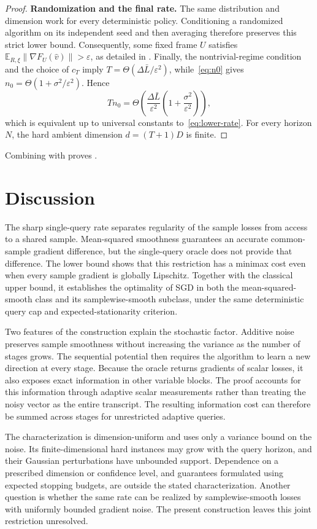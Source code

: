 \documentclass[11pt]{article}
\newcommand{\E}{\mathbb E}
\newcommand{\eps}{\varepsilon}
\newcommand{\Lb}{\bar L}
\theoremstyle{definition}
\theoremstyle{remark}
\begin{document}
\begin{proof}
\noindent\textbf{Randomization and the final rate.}
The same distribution and dimension work for every deterministic policy.
Conditioning a randomized algorithm on its independent seed and then averaging
therefore preserves this strict lower bound.  Consequently, some fixed frame
$U$ satisfies $\E_{R,\xi}\|\nabla F_U(\widehat v)\|>\eps$, as detailed in
.  Finally, the nontrivial-regime condition and the choice of
$c_T$ imply
$T=\Theta(\Delta\Lb/\eps^2)$, while~\eqref{eq:n0} gives
$n_0=\Theta(1+\sigma^2/\eps^2)$.  Hence
\[
 Tn_0
 =\Theta\!\left(
   \frac{\Delta\Lb}{\eps^2}
   \left(1+\frac{\sigma^2}{\eps^2}\right)
 \right),
\]
which is equivalent up to universal constants to~\eqref{eq:lower-rate}.
For every horizon $N$, the hard ambient dimension $d=(T+1)D$ is finite.
\end{proof}

Combining  with  proves
.

\section{Discussion}\label{sec:discussion}

The sharp single-query rate separates regularity of the sample losses from
access to a shared sample. Mean-squared smoothness guarantees an accurate
common-sample gradient difference, but the single-query oracle does not
provide that difference. The lower bound shows that this restriction has a
minimax cost even when every sample gradient is globally Lipschitz.
Together with the classical upper bound, it establishes the optimality of
SGD in both the mean-squared-smooth class and its samplewise-smooth
subclass, under the same deterministic query cap and expected-stationarity
criterion.

Two features of the construction explain the stochastic factor. Additive
noise preserves sample smoothness without increasing the variance as the
number of stages grows. The sequential potential then requires the
algorithm to learn a new direction at every stage. Because the oracle
returns gradients of scalar losses, it also exposes exact information in
other variable blocks. The proof accounts for this information through
adaptive scalar measurements rather than treating the noisy vector as
the entire transcript. The resulting information cost can therefore be
summed across stages for unrestricted adaptive queries.

The characterization is dimension-uniform and uses only a variance bound
on the noise. Its finite-dimensional hard instances may grow with the
query horizon, and their Gaussian perturbations have unbounded support.
Dependence on a prescribed dimension or confidence level, and guarantees
formulated using expected stopping budgets, are outside the stated
characterization. Another question is whether the same rate can be
realized by samplewise-smooth losses with uniformly bounded gradient
noise. The present construction leaves this joint restriction unresolved.
\end{document}
